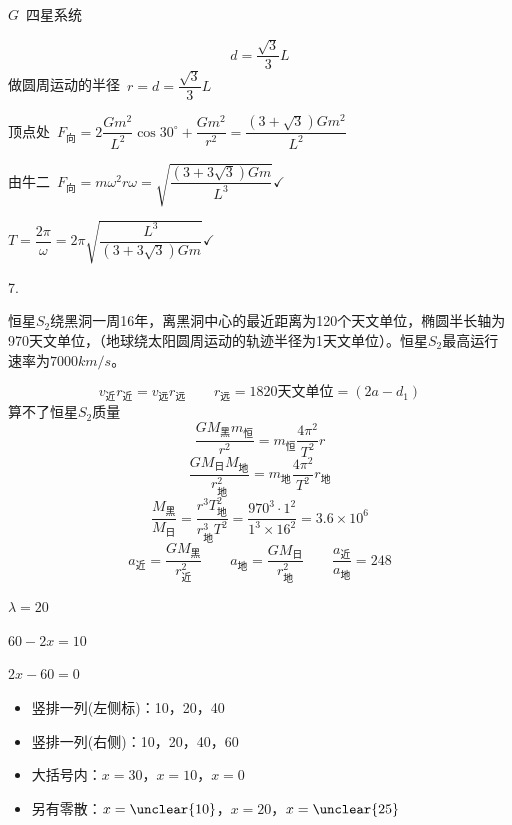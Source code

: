 \begin{problem}
$G$\ 四星系统
\begin{solution}
\[
d=\frac{\sqrt3}{3}L
\]
做圆周运动的半径\ $r=d=\dfrac{\sqrt3}{3}L$

顶点处\ $F_{\text{向}}=2\dfrac{Gm^2}{L^2}\cos30^\circ+\dfrac{Gm^2}{r^2}=\dfrac{(3+\sqrt3)Gm^2}{L^2}$

由牛二\ $F_{\text{向}}=m\omega^2r$\quad $\omega=\sqrt{\dfrac{(3+3\sqrt3)Gm}{L^3}}$\quad $\checkmark$

$T=\dfrac{2\pi}{\omega}=2\pi\sqrt{\dfrac{L^3}{(3+3\sqrt3)Gm}}$\quad $\checkmark$
\end{solution}
\end{problem}
7.
\begin{problem}
恒星$S_2$绕黑洞一周16年，离黑洞中心的最近距离为120个天文单位，椭圆半长轴为970天文单位，（地球绕太阳圆周运动的轨迹半径为1天文单位）。恒星$S_2$最高运行速率为$7000\unit{km/s}$。 %
\begin{solution}
\[
v_{\text{近}}r_{\text{近}}=v_{\text{远}}r_{\text{远}}\qquad r_{\text{远}}=1820\text{天文单位}=(2a-d_1) %
\]
算不了恒星$S_2$质量
\[
\frac{GM_{\text{黑}}m_{\text{恒}}}{r^2}=m_{\text{恒}}\frac{4\pi^2}{T^2}r
\]
\[
\frac{GM_{\text{日}}M_{\text{地}}}{r_{\text{地}}^2}=m_{\text{地}}\frac{4\pi^2}{T^2}r_{\text{地}}
\]
\[
\frac{M_{\text{黑}}}{M_{\text{日}}}=\frac{r^3T_{\text{地}}^2}{r_{\text{地}}^3T^2}=\frac{970^3\cdot1^2}{1^3\times16^2}=3.6\times10^6
\]
\[
a_{\text{近}}=\frac{GM_{\text{黑}}}{r_{\text{近}}^2}\qquad a_{\text{地}}=\frac{GM_{\text{日}}}{r_{\text{地}}^2}\qquad \frac{a_{\text{近}}}{a_{\text{地}}}=248
\]
\end{solution}
\end{problem}

$\lambda=20$ %

$60-2x=10$\ 

$2x-60=0$

\begin{itemize}
\item 竖排一列(左侧标)：10，20，40
\item 竖排一列(右侧)：10，20，40，60
\item 大括号内：$x=30$，$x=10$，$x=0$
\item 另有零散：$x=\unclear{10}$，$x=20$，$x=\unclear{25}$ %
\end{itemize}
